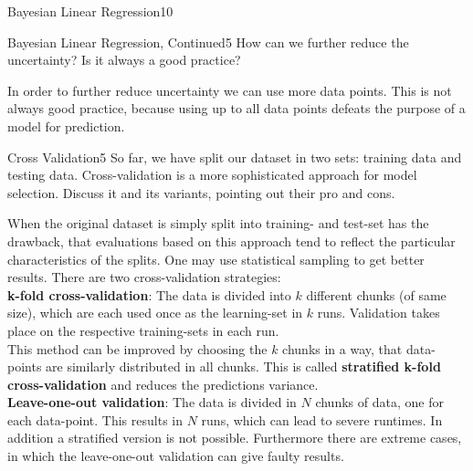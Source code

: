 \begin{questions}
\begin{question}{Bayesian Linear Regression}{10}
\begin{answer}
\end{answer}
\end{question}


\begin{question}{Bayesian Linear Regression, Continued}{5}
How can we further reduce the uncertainty? Is it always a good practice?

\begin{answer}
In order to further reduce uncertainty we can use more data points. This is not always good practice, because using up to all data points defeats the purpose of a model for prediction.
\end{answer}
\end{question}


\begin{question}[bonus]{Cross Validation}{5}
So far, we have split our dataset in two sets: training data and testing data. Cross-validation is a more sophisticated approach for model selection. Discuss it and its variants, pointing out their pro and cons.
\end{question}

\begin{answer}
When the original dataset is simply split into training- and test-set has the drawback, that evaluations based on this approach tend to reflect the particular characteristics of the splits. One may use statistical sampling to get better results. There are two cross-validation strategies:\\
\textbf{k-fold cross-validation}: The data is divided into $k$ different chunks (of same size), which are each used once as the learning-set in $k$ runs. Validation takes place on the respective training-sets in each run.\\
This method can be improved by choosing the $k$ chunks in a way, that data-points are similarly distributed in all chunks. This is called \textbf{stratified k-fold cross-validation} and reduces the predictions variance. \\
\textbf{Leave-one-out validation}: The data is divided in $N$ chunks of data, one for each data-point. This results in $N$ runs, which can lead to severe runtimes. In addition a stratified version is not possible. Furthermore there are extreme cases, in which the leave-one-out validation can give faulty results.
\end{answer}

\end{questions}
